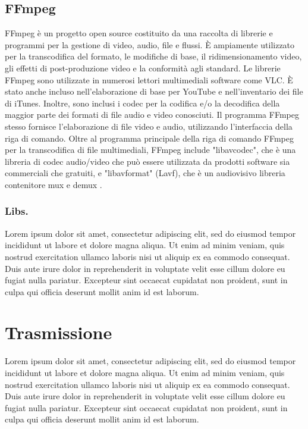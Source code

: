 \subsection{FFmpeg}
FFmpeg è un progetto open source costituito da una raccolta di librerie e programmi per la gestione di video, audio, file e flussi. È ampiamente utilizzato per la transcodifica del formato, le modifiche di base, il ridimensionamento video, gli effetti di post-produzione video e la conformità agli standard. Le librerie FFmpeg sono utilizzate in numerosi lettori multimediali software come VLC. È stato anche incluso nell'elaborazione di base per YouTube e nell'inventario dei file di iTunes. Inoltre, sono inclusi i codec per la codifica e/o la decodifica della maggior parte dei formati di file audio e video conosciuti. Il programma FFmpeg stesso fornisce l'elaborazione di file video e audio, utilizzando l'interfaccia della riga di comando. Oltre al programma principale della riga di comando FFmpeg per la transcodifica di file multimediali, FFmpeg include "libavcodec", che è una libreria di codec audio/video che può essere utilizzata da prodotti software sia commerciali che gratuiti, e "libavformat" (Lavf), che è un audiovisivo libreria contenitore mux e demux \parencite{FFmpeg_Documentation}.

\subsubsection{Libs.}
Lorem ipsum dolor sit amet, consectetur adipiscing elit, sed do eiusmod tempor incididunt ut labore et dolore magna aliqua. Ut enim ad minim veniam, quis nostrud exercitation ullamco laboris nisi ut aliquip ex ea commodo consequat. Duis aute irure dolor in reprehenderit in voluptate velit esse cillum dolore eu fugiat nulla pariatur. Excepteur sint occaecat cupidatat non proident, sunt in culpa qui officia deserunt mollit anim id est laborum.




\section{Trasmissione}
Lorem ipsum dolor sit amet, consectetur adipiscing elit, sed do eiusmod tempor incididunt ut labore et dolore magna aliqua. Ut enim ad minim veniam, quis nostrud exercitation ullamco laboris nisi ut aliquip ex ea commodo consequat. Duis aute irure dolor in reprehenderit in voluptate velit esse cillum dolore eu fugiat nulla pariatur. Excepteur sint occaecat cupidatat non proident, sunt in culpa qui officia deserunt mollit anim id est laborum.

